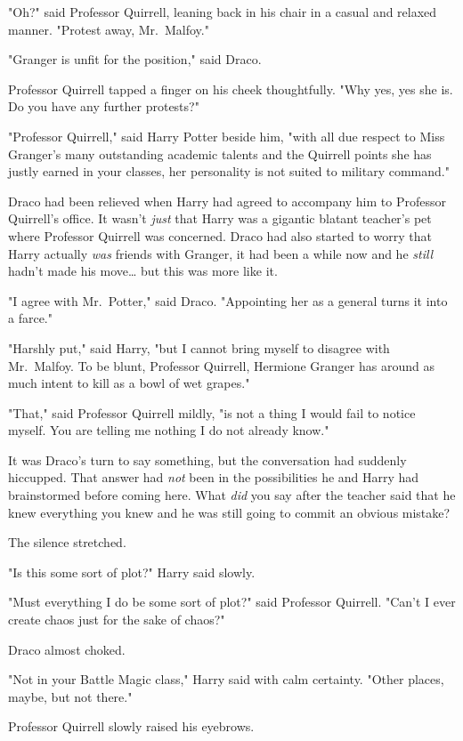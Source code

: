 "Oh?" said Professor Quirrell, leaning back in his chair in a casual and
relaxed manner. "Protest away, Mr.~Malfoy."

"Granger is unfit for the position," said Draco.

Professor Quirrell tapped a finger on his cheek thoughtfully. "Why yes, yes she
is. Do you have any further protests?"

"Professor Quirrell," said Harry Potter beside him, "with all due respect to
Miss Granger's many outstanding academic talents and the Quirrell points she
has justly earned in your classes, her personality is not suited to military
command."

Draco had been relieved when Harry had agreed to accompany him to Professor
Quirrell's office. It wasn't \emph{just} that Harry was a gigantic blatant
teacher's pet where Professor Quirrell was concerned. Draco had also started to
worry that Harry actually \emph{was} friends with Granger, it had been a while
now and he \emph{still} hadn't made his move{\ldots} but this was more like it.

"I agree with Mr.~Potter," said Draco. "Appointing her as a general turns it
into a farce."

"Harshly put," said Harry, "but I cannot bring myself to disagree with
Mr.~Malfoy. To be blunt, Professor Quirrell, Hermione Granger has around as
much intent to kill as a bowl of wet grapes."

"That," said Professor Quirrell mildly, "is not a thing I would fail to notice
myself. You are telling me nothing I do not already know."

It was Draco's turn to say something, but the conversation had suddenly
hiccupped. That answer had \emph{not} been in the possibilities he and Harry
had brainstormed before coming here. What \emph{did} you say after the teacher
said that he knew everything you knew and he was still going to commit an
obvious mistake?

The silence stretched.

"Is this some sort of plot?" Harry said slowly.

"Must everything I do be some sort of plot?" said Professor Quirrell. "Can't I
ever create chaos just for the sake of chaos?"

Draco almost choked.

"Not in your Battle Magic class," Harry said with calm certainty. "Other
places, maybe, but not there."

Professor Quirrell slowly raised his eyebrows.

